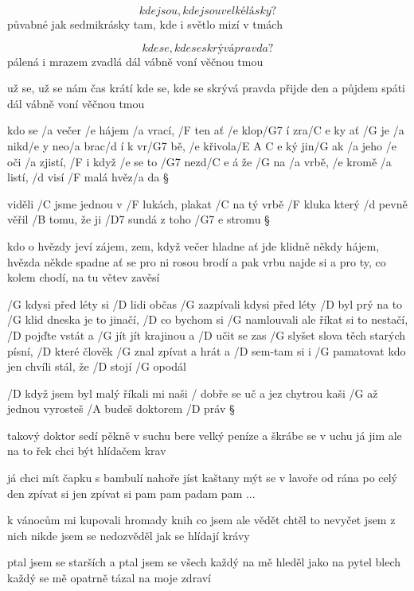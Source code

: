 \[ kde jsou, kde jsou velké lásky? \]
půvabné jak sedmikrásky
tam, kde i světlo mizí v tmách \s

\[ kde se, kde se skrývá pravda? \]
pálená i mrazem zvadlá
dál vábně voní věčnou tmou \s

už se, už se nám čas krátí
kde se, kde se skrývá pravda
přijde den a půjdem spáti
dál vábně voní věčnou tmou




kdo se /a večer /e hájem /a vrací, /F ten ať /e klop/G7 í zra/{C e} ky
ať /G je /a nikd/e y neo/a brac/d í k vr/G7 bě, /e křivola/{E A C e} ký
jin/G ak /a jeho /e oči /a zjistí, /F i když /e se to /G7 nezd/{C e} á
že /G na /a vrbě, /e kromě /a listí, /d visí /F malá hvěz/a da \S

viděli /C jsme jednou v /F lukách, plakat /C na tý vrbě /F kluka
který /d pevně věřil /B tomu, že ji /D7 sundá z toho /{G7 e} stromu \S

kdo o hvězdy jeví zájem, zem, když večer hladne
ať jde klidně někdy hájem, hvězda někde spadne
ať se pro ni rosou brodí a pak vrbu najde si
a pro ty, co kolem chodí, na tu větev zavěsí




/G kdysi před léty si /D lidi občas /G zazpívali
kdysi před léty /D byl prý na to /G klid
dneska je to jinačí, /D co bychom si /G namlouvali
ale říkat si to nestačí, /D pojďte vstát a /G jít
jít krajinou a /D učit se zas /G slyšet slova
těch starých písní, /D které člověk /G znal
zpívat a hrát a /D sem-tam si i /G pamatovat
kdo jen chvíli stál, že /D stojí /G opodál




/D když jsem byl malý říkali mi naši
/ dobře se uč a jez chytrou kaši
/G až jednou vyrosteš /A budeš doktorem /D práv \S

takový doktor sedí pěkně v suchu
bere velký peníze a škrábe se v uchu
já jim ale na to řek chci být hlídačem krav \s

já chci mít čapku s bambulí nahoře
jíst kaštany mýt se v lavoře
od rána po celý den
zpívat si jen
zpívat si pam pam padam pam ... \s

k vánocům mi kupovali hromady knih
co jsem ale vědět chtěl to nevyčet jsem z nich
nikde jsem se nedozvěděl jak se hlídají krávy \s

ptal jsem se starších a ptal jsem se všech
každý na mě hleděl jako na pytel blech
každý se mě opatrně tázal na moje zdraví \s

